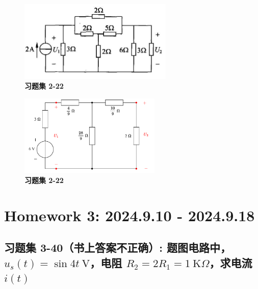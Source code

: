 \documentclass[UTF8]{report}
\def\kO{\ \mathrm{K}\Omega}
\theoremstyle{MyLineTheoremStyle} %
\theoremstyle{MyBlockTheoremStyle} %
\theoremstyle{MySubsubsectionStyle} %
\begin{document}
\noindent\begin{minipage}{0.49\textwidth}
\begin{figure}[H]\centering
\includegraphics[height=110pt]{assets/2/0c8d1f0fb90ef6983c0aef6451919e4b.jpg}
\caption{\textbf{习题集 2-22}}
\end{figure}
\end{minipage}\hfill
\begin{minipage}{0.49\textwidth}
\begin{figure}[H]\centering
\includegraphics[height=110pt]{assets/2/2-22.drawio.pdf}
\caption{\textbf{习题集 2-22}}\label{2-22}
\end{figure}
\end{minipage}




\chapter{Homework 3: 2024.9.10 - 2024.9.18}\thispagestyle{fancy}


\section{习题集 3-40（书上答案不正确）: 题图电路中，$u_s(t) = \sin 4t\ \mathrm{V} $，电阻 $R_2 = 2R_1 = 1 \kO$，求电流 $i(t)$}
\end{document}
